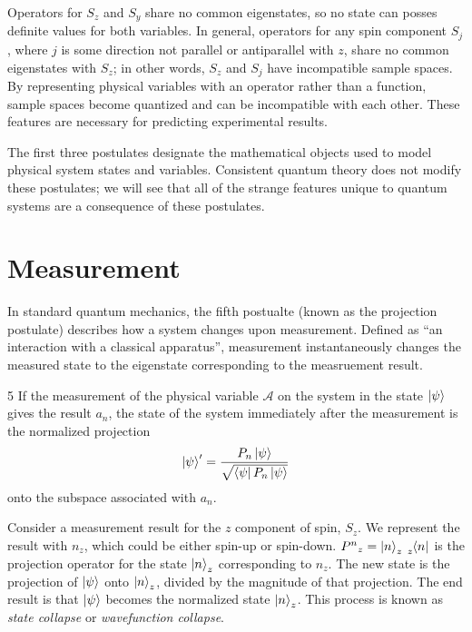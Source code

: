 Operators for $S_z$ and $S_y$ share no common eigenstates, so no state can posses definite values for both variables. In general, operators for any spin component $S_j$, where $j$ is some direction not parallel or antiparallel with $z$, share no common eigenstates with $S_z$; in other words, $S_z$ and $S_j$ have incompatible sample spaces. By representing physical variables with an operator rather than a function, sample spaces become quantized and can be incompatible with each other. These features are necessary for predicting experimental results.

The first three postulates designate the mathematical objects used to model physical system states and variables. Consistent quantum theory does not modify these postulates; we will see that all of the strange features unique to quantum systems are a consequence of these postulates.

\section{Measurement}
\label{Section:Measurement}

In standard quantum mechanics, the fifth postualte (known as the projection postulate) describes how a system changes upon measurement. Defined as ``an interaction with a classical apparatus'', measurement instantaneously changes the measured state to the eigenstate corresponding to the measruement result.

\begin{Thm:Postulate}{5}
    If the measurement of the physical variable $\mathcal{A}$ on the system in the state $\ket{\psi}$ gives the result $a_n$, the state of the system immediately after the measurement is the normalized projection
    \begin{align*}
        \ket{\psi}^\prime = \frac{P_n\ket{\psi}}{\sqrt{\bra{\psi}P_n\ket{\psi}
        }}
    \end{align*}
    onto the subspace associated with $a_n$.
\end{Thm:Postulate}

Consider a measurement result for the $z$ component of spin, $S_z$. We represent the result with $n_z$, which could be either spin-up or spin-down. ${P^n}_z = \ket{n}_z\tensor[_z]{\bra{n}}{}$ is the projection operator for the state $\ket{n}_z$ corresponding to $n_z$. The new state is the projection of $\ket{\psi}$ onto $\ket{n}_z$, divided by the magnitude of that projection. The end result is that $\ket{\psi}$ becomes the normalized state $\ket{n}_z$. This process is known as \textit{state collapse} or \textit{wavefunction collapse}.

